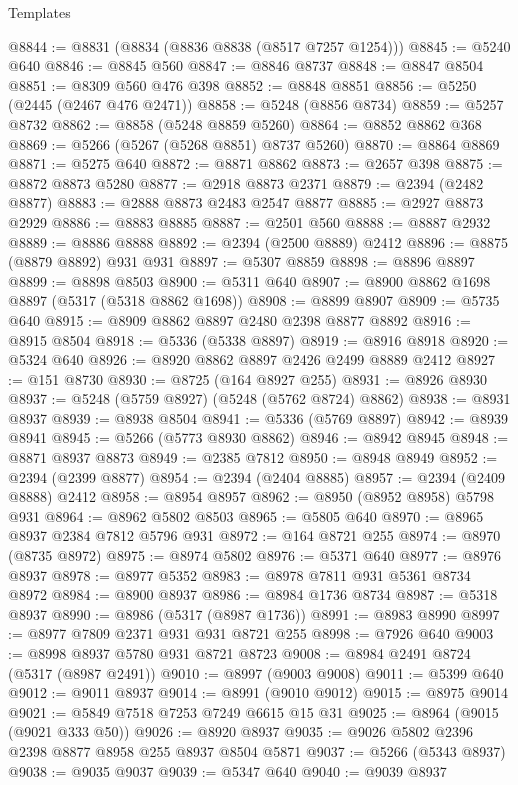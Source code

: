\begin{lexlean}{Templates}
\begin{coremodule}
@8844 := @8831 (@8834 (@8836 @8838 (@8517 @7257 @1254)))
@8845 := @5240 @640
@8846 := @8845 @560
@8847 := @8846 @8737
@8848 := @8847 @8504
@8851 := @8309 @560 @476 @398
@8852 := @8848 @8851
@8856 := @5250 (@2445 (@2467 @476 @2471))
@8858 := @5248 (@8856 @8734)
@8859 := @5257 @8732
@8862 := @8858 (@5248 @8859 @5260)
@8864 := @8852 @8862 @368
@8869 := @5266 (@5267 (@5268 @8851) @8737 @5260)
@8870 := @8864 @8869
@8871 := @5275 @640
@8872 := @8871 @8862
@8873 := @2657 @398
@8875 := @8872 @8873 @5280
@8877 := @2918 @8873 @2371
@8879 := @2394 (@2482 @8877)
@8883 := @2888 @8873 @2483 @2547 @8877
@8885 := @2927 @8873 @2929
@8886 := @8883 @8885
@8887 := @2501 @560
@8888 := @8887 @2932
@8889 := @8886 @8888
@8892 := @2394 (@2500 @8889) @2412
@8896 := @8875 (@8879 @8892) @931 @931
@8897 := @5307 @8859
@8898 := @8896 @8897
@8899 := @8898 @8503
@8900 := @5311 @640
@8907 := @8900 @8862 @1698 @8897 (@5317 (@5318 @8862 @1698))
@8908 := @8899 @8907
@8909 := @5735 @640
@8915 := @8909 @8862 @8897 @2480 @2398 @8877 @8892
@8916 := @8915 @8504
@8918 := @5336 (@5338 @8897)
@8919 := @8916 @8918
@8920 := @5324 @640
@8926 := @8920 @8862 @8897 @2426 @2499 @8889 @2412
@8927 := @151 @8730
@8930 := @8725 (@164 @8927 @255)
@8931 := @8926 @8930
@8937 := @5248 (@5759 @8927) (@5248 (@5762 @8724) @8862)
@8938 := @8931 @8937
@8939 := @8938 @8504
@8941 := @5336 (@5769 @8897)
@8942 := @8939 @8941
@8945 := @5266 (@5773 @8930 @8862)
@8946 := @8942 @8945
@8948 := @8871 @8937 @8873
@8949 := @2385 @7812
@8950 := @8948 @8949
@8952 := @2394 (@2399 @8877)
@8954 := @2394 (@2404 @8885)
@8957 := @2394 (@2409 @8888) @2412
@8958 := @8954 @8957
@8962 := @8950 (@8952 @8958) @5798 @931
@8964 := @8962 @5802 @8503
@8965 := @5805 @640
@8970 := @8965 @8937 @2384 @7812 @5796 @931
@8972 := @164 @8721 @255
@8974 := @8970 (@8735 @8972)
@8975 := @8974 @5802
@8976 := @5371 @640
@8977 := @8976 @8937
@8978 := @8977 @5352
@8983 := @8978 @7811 @931 @5361 @8734 @8972
@8984 := @8900 @8937
@8986 := @8984 @1736 @8734
@8987 := @5318 @8937
@8990 := @8986 (@5317 (@8987 @1736))
@8991 := @8983 @8990
@8997 := @8977 @7809 @2371 @931 @931 @8721 @255
@8998 := @7926 @640
@9003 := @8998 @8937 @5780 @931 @8721 @8723
@9008 := @8984 @2491 @8724 (@5317 (@8987 @2491))
@9010 := @8997 (@9003 @9008)
@9011 := @5399 @640
@9012 := @9011 @8937
@9014 := @8991 (@9010 @9012)
@9015 := @8975 @9014
@9021 := @5849 @7518 @7253 @7249 @6615 @15 @31
@9025 := @8964 (@9015 (@9021 @333 @50))
@9026 := @8920 @8937
@9035 := @9026 @5802 @2396 @2398 @8877 @8958 @255 @8937 @8504 @5871
@9037 := @5266 (@5343 @8937)
@9038 := @9035 @9037
@9039 := @5347 @640
@9040 := @9039 @8937

\end{coremodule}
\end{lexlean}
